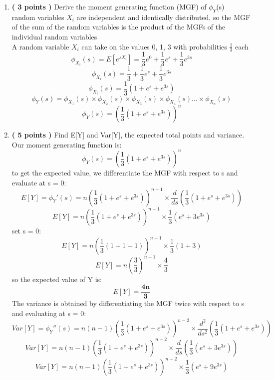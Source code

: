 \documentclass[a3paper,12pt]{extarticle} %
\begin{document}
    \begin{enumerate}
        \item \textbf{( 3 points )} Derive the moment generating function (MGF) of \(\phi_Y\)(s)
        \\ random variables \(X_i\) are independent and identically distributed, so the MGF of the sum of the random variables is the product of the MGFs of the individual random variables
        \\ A random variable \(X_i\) can take on the values 0, 1, 3 with probabilities \(\frac{1}{3}\) each
        \[
        \phi_{X_i}(s) = E[e^{sX_i}] = \frac{1}{3}e^{0} + \frac{1}{3}e^{s} + \frac{1}{3}e^{3s}
        \]
        \[
        \phi_{X_i}(s) = \frac{1}{3} + \frac{1}{3}e^{s} + \frac{1}{3}e^{3s}
        \]
        \[
        \phi_{X_i}(s) = \frac{1}{3}(1 + e^{s} + e^{3s})
        \]
        \[
        \phi_{Y}(s) = \phi_{X_1}(s) \times \phi_{X_2}(s) \times \phi_{X_3}(s) \times \phi_{X_4}(s) \dots \times \phi_{X_n}(s)
        \]
        \[
        \phi_{Y}(s) = \left(\frac{1}{3}(1 + e^{s} + e^{3s})\right)^n
        \]
        \item \textbf{( 5 points )} Find E[Y] and Var[Y], the expected total points and variance.
        \\ Our moment generating function is:
        \[
        \phi_{Y}(s) = \left(\frac{1}{3}(1 + e^{s} + e^{3s})\right)^n
        \]
        to get the expected value, we differentiate the MGF with respect to s and evaluate at s = 0:
        \[
        E[Y] = \phi_{Y}'(s) = n\left(\frac{1}{3}(1 + e^{s} + e^{3s})\right)^{n-1} \times \frac{d}{ds}\left(\frac{1}{3}(1 + e^{s} + e^{3s})\right)
        \]
        \[
        E[Y] = n\left(\frac{1}{3}(1 + e^{s} + e^{3s})\right)^{n-1} \times \frac{1}{3}(e^{s} + 3e^{3s})
        \]
        set s = 0:
        \[
        E[Y] = n\left(\frac{1}{3}(1 + 1 + 1)\right)^{n-1} \times \frac{1}{3}(1 + 3)
        \]
        \[
        E[Y] = n\left(\frac{3}{3}\right)^{n-1} \times \frac{4}{3}
        \]
        so the expected value of Y is:
        \[
        E[Y] = \mathbf{\frac{4n}{3}}
        \]
        The variance is obtained by differentiating the MGF twice with respect to s and evaluating at s = 0:
        \[
        Var[Y] = \phi_{Y}''(s) = n(n-1)\left(\frac{1}{3}(1 + e^{s} + e^{3s})\right)^{n-2} \times \frac{d^2}{ds^2}\left(\frac{1}{3}(1 + e^{s} + e^{3s})\right)
        \]
        \[
        Var[Y] = n(n-1)\left(\frac{1}{3}(1 + e^{s} + e^{3s})\right)^{n-2} \times \frac{d}{ds}\left(\frac{1}{3}(e^{s} + 3e^{3s})\right)
        \]
        \[
        Var[Y] = n(n-1)\left(\frac{1}{3}(1 + e^{s} + e^{3s})\right)^{n-2} \times \frac{1}{3}(e^{s} + 9e^{3s})
\]
\end{enumerate}
\end{document}
